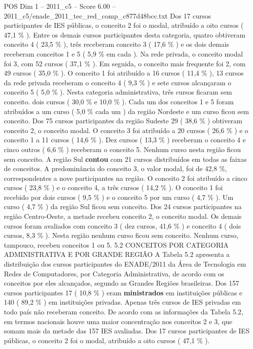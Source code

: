 \begin{textsample}{POS Dim 1 – 2011\_c5 – Score 6.00 – 2011\_c5/enade\_2011\_tec\_red\_comp\_c877d48bcc.txt}
Dos 17 cursos participantes de IES públicas, o conceito 2 foi o modal, atribuído a oito cursos ( 47,1 \% ).
Entre os demais cursos participantes desta categoria, quatro obtiveram conceito 4 ( 23,5 \% ), três receberam conceito 3 ( 17,6 \% ) e os dois demais receberam conceitos 1 e 5 ( 5,9 \% em cada ).
Na rede privada, o conceito modal foi 3, com 52 cursos ( 37,1 \% ).
Em seguida, o conceito mais frequente foi 2, com 49 cursos ( 35,0 \% ).
O conceito 1 foi atribuído a 16 cursos ( 11,4 \% ), 13 cursos da rede privada receberam o conceito 4 ( 9,3 \% ) e sete cursos alcançaram o conceito 5 ( 5,0 \% ).
Nesta categoria administrativa, três cursos ficaram sem conceito. dois cursos ( 30,0 \% e 10,0 \% ).
Cada um dos conceitos 1 e 5 foram atribuídos a um curso ( 5,0 \% cada um ) da região Nordeste e um curso ficou sem conceito.
Dos 75 cursos participantes da região Sudeste 29 ( 38,6 \% ) obtiveram conceito 2, o conceito modal.
O conceito 3 foi atribuído a 20 cursos ( 26,6 \% ) e o conceito 1 a 11 cursos ( 14,6 \% ).
Dez cursos ( 13,3 \% ) receberam o conceito 4 e cinco outros ( 6,6 \% ) receberam o conceito 5.
Nenhum curso nesta região ficou sem conceito.
A região Sul \textbf{contou} com 21 cursos distribuídos em todas as faixas de conceitos.
A predominância do conceito 3, o valor modal, foi de 42,8 \%, correspondentes a nove participantes na região.
O conceito 2 foi atribuído a cinco cursos ( 23,8 \% ) e o conceito 4, a três cursos ( 14,2 \% ).
O conceito 1 foi recebido por dois cursos ( 9,5 \% ) e o conceito 5 por um curso ( 4,7 \% ).
Um curso ( 4,7 \% ) da região Sul ficou sem conceito.
Dos 24 cursos participantes na região Centro-Oeste, a metade recebeu conceito 2, o conceito modal.
Os demais cursos foram avaliados com conceito 3 ( dez cursos, 41,6 \% ) e conceito 4 ( dois cursos, 8,3 \% ).
Nesta região nenhum curso ficou sem conceito.
Nenhum curso, tampouco, recebeu conceitos 1 ou 5. 5.2 CONCEITOS POR CATEGORIA ADMINISTRATIVA E POR GRANDE REGIÃO A Tabela 5.2 apresenta a distribuição dos cursos participantes do ENADE/2011 da Área de Tecnologia em Redes de Computadores, por Categoria Administrativa, de acordo com os conceitos por eles alcançados, segundo as Grandes Regiões brasileiras.
Dos 157 cursos participantes 17 ( 10,8 \% ) eram \textbf{ministrados} em instituições públicas e 140 ( 89,2 \% ) em instituições privadas.
Apenas três cursos de IES privadas em todo país não receberam conceito.
De acordo com as informações da Tabela 5.2, em termos nacionais houve uma maior concentração nos conceitos 2 e 3, que somam mais da metade das 157 IES avaliadas.
Dos 17 cursos participantes de IES públicas, o conceito 2 foi o modal, atribuído a oito cursos ( 47,1 \% ).

\end{textsample}

